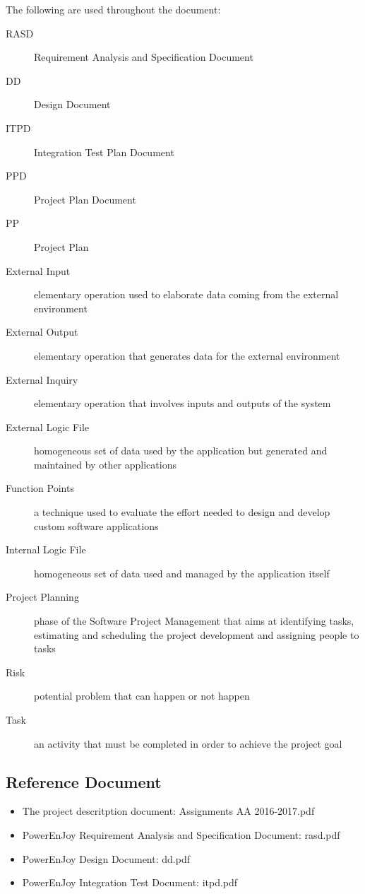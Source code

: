 	The following are used throughout the document:
	\begin{description}
		\item [RASD] Requirement Analysis and Specification Document
		\item [DD] Design Document
		\item [ITPD] Integration Test Plan Document
		\item [PPD] Project Plan Document
		\item [PP] Project Plan
		\item [External Input] elementary operation used to elaborate data coming from the external environment
		\item [External Output] elementary operation that generates data for the external environment
		\item [External Inquiry] elementary operation that involves inputs and outputs of the system
		\item [External Logic File] homogeneous set of data used by the application but generated and maintained by other applications
		\item [Function Points] a technique used to evaluate the effort needed to design and develop custom software applications
		\item [Internal Logic File] homogeneous set of data used and managed by the application itself
		\item [Project Planning] phase of the Software Project Management that aims at identifying tasks, estimating and scheduling the project development and assigning people to tasks
		\item [Risk] potential problem that can happen or not happen
		\item [Task] an activity that must be completed in order to achieve the project goal
	\end{description}


\subsection{Reference Document}
\begin{itemize}
	\item The project descritption document: Assignments AA 2016-2017.pdf
	\item PowerEnJoy Requirement Analysis and Specification Document: rasd.pdf
	\item PowerEnJoy Design Document: dd.pdf
	\item PowerEnJoy Integration Test Document: itpd.pdf
\end{itemize}
	